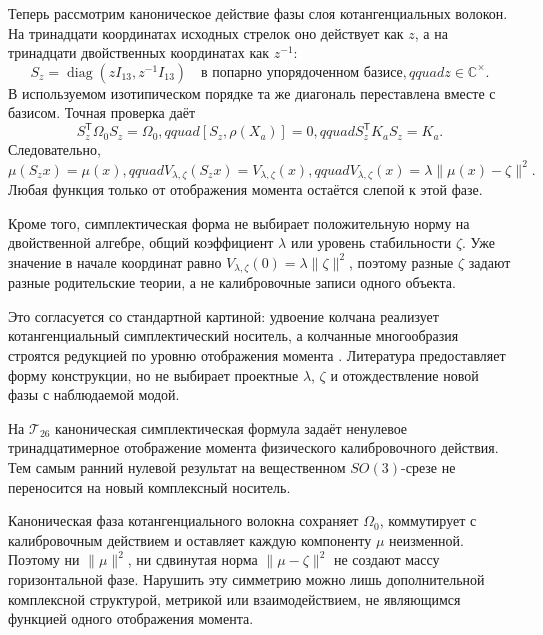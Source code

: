 Теперь рассмотрим каноническое действие фазы слоя котангенциальных
волокон. На тринадцати координатах исходных стрелок оно действует как $z$,
а на тринадцати двойственных координатах как $z^{-1}$:
\begin{equation}
 S_z=\operatorname{diag}(zI_{13},z^{-1}I_{13})
 \quad\text{в попарно упорядоченном базисе},qquad z\in\mathbb C^\times.
 \label{eq:v8-cotangent-fibre-phase}
\end{equation}
В используемом изотипическом порядке та же диагональ переставлена вместе с
базисом. Точная проверка даёт
\begin{equation}
 S_z^{\mathsf T}\Omega_0S_z=\Omega_0,qquad
 [S_z,\rho(X_a)]=0,qquad
 S_z^{\mathsf T}K_aS_z=K_a.
 \label{eq:v8-cotangent-phase-invariance}
\end{equation}
Следовательно,
\begin{equation}
 \mu(S_zx)=\mu(x),qquad
 V_{\lambda,\zeta}(S_zx)=V_{\lambda,\zeta}(x),qquad
 V_{\lambda,\zeta}(x)=\lambda\|\mu(x)-\zeta\|^2.
 \label{eq:v8-cotangent-parent-phase-blindness}
\end{equation}
Любая функция только от отображения момента остаётся слепой к этой фазе.

Кроме того, симплектическая форма не выбирает положительную норму на
двойственной алгебре, общий коэффициент $\lambda$ или уровень стабильности
$\zeta$. Уже значение в начале координат равно
$V_{\lambda,\zeta}(0)=\lambda\|\zeta\|^2$, поэтому разные $\zeta$ задают
разные родительские теории, а не калибровочные записи одного объекта.

Это согласуется со стандартной картиной: удвоение колчана реализует
котангенциальный симплектический носитель, а колчанные многообразия строятся
редукцией по уровню отображения момента
\cite{v8-cotangent-crawley-boevey,v8-cotangent-harada-wilkin}.
Литература предоставляет форму конструкции, но не выбирает проектные
$\lambda$, $\zeta$ и отождествление новой фазы с наблюдаемой модой.

\begin{theorem}
На $\mathcal T_{26}$ каноническая симплектическая формула задаёт ненулевое
тринадцатимерное отображение момента физического калибровочного действия.
Тем самым ранний нулевой результат на вещественном $SO(3)$-срезе не
переносится на новый комплексный носитель.
\end{theorem}

\begin{nogocriterion}
Каноническая фаза котангенциального волокна сохраняет $\Omega_0$, коммутирует
с калибровочным действием и оставляет каждую компоненту $\mu$ неизменной.
Поэтому ни $\|\mu\|^2$, ни сдвинутая норма $\|\mu-\zeta\|^2$ не создают
массу горизонтальной фазе. Нарушить эту симметрию можно лишь дополнительной
комплексной структурой, метрикой или взаимодействием, не являющимся функцией
одного отображения момента.
\end{nogocriterion}

